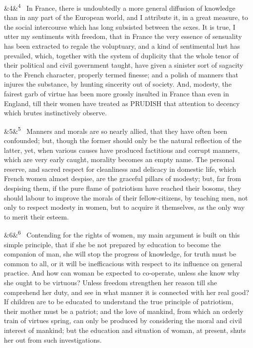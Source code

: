 \documentclass[12pt]{article}
\newcommand{\para}[1][]{\par\noindent\ifx&#1&\else\textsuperscript{\footnotesize #1}~\fi}
\begin{document}
\para[4] In France, there is undoubtedly a more general diffusion of knowledge than in any part of the European world, and I attribute it, in a great measure, to the social intercourse which has long subsisted between the sexes. It is true, I utter my sentiments with freedom, that in France the very essence of sensuality has been extracted to regale the voluptuary, and a kind of sentimental lust has prevailed, which, together with the system of duplicity that the whole tenor of their political and civil government taught, have given a sinister sort of sagacity to the French character, properly termed finesse; and a polish of manners that injures the substance, by hunting sincerity out of society. And, modesty, the fairest garb of virtue has been more grossly insulted in France than even in England, till their women have treated as PRUDISH that attention to decency which brutes instinctively observe.

\para[5] Manners and morals are so nearly allied, that they have often been confounded; but, though the former should only be the natural reflection of the latter, yet, when various causes have produced factitious and corrupt manners, which are very early caught, morality becomes an empty name. The personal reserve, and sacred respect for cleanliness and delicacy in domestic life, which French women almost despise, are the graceful pillars of modesty; but, far from despising them, if the pure flame of patriotism have reached their bosoms, they should labour to improve the morals of their fellow-citizens, by teaching men, not only to respect modesty in women, but to acquire it themselves, as the only way to merit their esteem.

\para[6] Contending for the rights of women, my main argument is built on this simple principle, that if she be not prepared by education to become the companion of man, she will stop the progress of knowledge, for truth must be common to all, or it will be inefficacious with respect to its influence on general practice. And how can woman be expected to co-operate, unless she know why she ought to be virtuous? Unless freedom strengthen her reason till she comprehend her duty, and see in what manner it is connected with her real good? If children are to be educated to understand the true principle of patriotism, their mother must be a patriot; and the love of mankind, from which an orderly train of virtues spring, can only be produced by considering the moral and civil interest of mankind; but the education and situation of woman, at present, shuts her out from such investigations.
\end{document}
